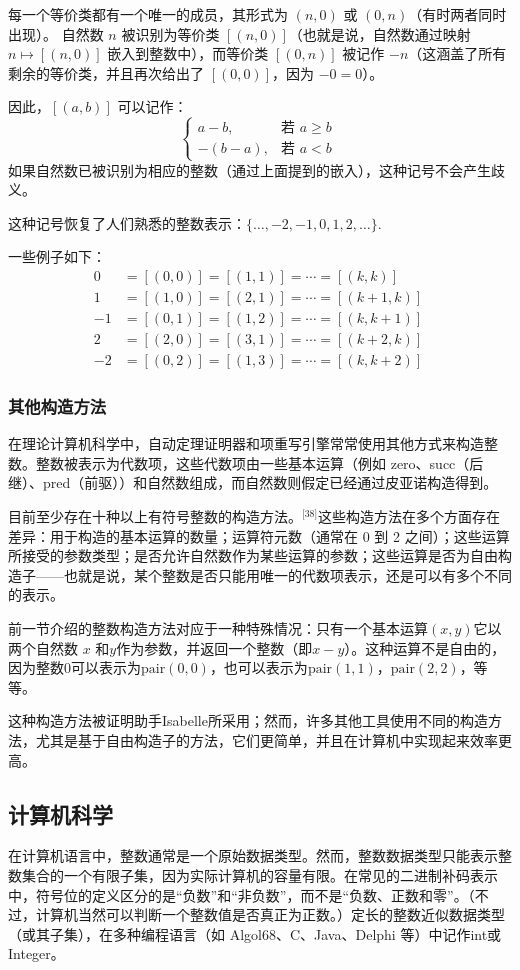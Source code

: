 每一个等价类都有一个唯一的成员，其形式为 $(n,0)$ 或 $(0,n)$（有时两者同时出现）。
自然数 $n$ 被识别为等价类 $[(n,0)]$（也就是说，自然数通过映射 $n \mapsto [(n,0)]$ 嵌入到整数中），而等价类 $[(0,n)]$ 被记作 $-n$（这涵盖了所有剩余的等价类，并且再次给出了 $[(0,0)]$，因为 $-0 = 0$）。

因此，$[(a,b)]$ 可以记作：
$$
\begin{cases}
a-b, & \text{若 } a \geq b \\[6pt]
-(b-a), & \text{若 } a < b
\end{cases}~
$$
如果自然数已被识别为相应的整数（通过上面提到的嵌入），这种记号不会产生歧义。

这种记号恢复了人们熟悉的整数表示：$\{ \ldots, -2, -1, 0, 1, 2, \ldots \}$.

一些例子如下：
$$
\begin{aligned}
0 &= [(0,0)] = [(1,1)] = \cdots = [(k,k)] \\[6pt]
1 &= [(1,0)] = [(2,1)] = \cdots = [(k+1,k)] \\[6pt]
-1 &= [(0,1)] = [(1,2)] = \cdots = [(k,k+1)] \\[6pt]
2 &= [(2,0)] = [(3,1)] = \cdots = [(k+2,k)] \\[6pt]
-2 &= [(0,2)] = [(1,3)] = \cdots = [(k,k+2)]
\end{aligned}~
$$
\subsubsection{其他构造方法}
在理论计算机科学中，自动定理证明器和项重写引擎常常使用其他方式来构造整数。整数被表示为代数项，这些代数项由一些基本运算（例如 zero、succ（后继）、pred（前驱））和自然数组成，而自然数则假定已经通过皮亚诺构造得到。

目前至少存在十种以上有符号整数的构造方法。\(^\text{[38]}\)这些构造方法在多个方面存在差异：用于构造的基本运算的数量；运算符元数（通常在 0 到 2 之间）；这些运算所接受的参数类型；是否允许自然数作为某些运算的参数；这些运算是否为自由构造子——也就是说，某个整数是否只能用唯一的代数项表示，还是可以有多个不同的表示。

前一节介绍的整数构造方法对应于一种特殊情况：只有一个基本运算$(x,y)$它以两个自然数 $x$ 和$y$作为参数，并返回一个整数（即$x-y$）。这种运算不是自由的，因为整数$0$可以表示为$\text{pair}(0,0)$，也可以表示为$\text{pair}(1,1)$，$\text{pair}(2,2)$，等等。

这种构造方法被证明助手Isabelle所采用；然而，许多其他工具使用不同的构造方法，尤其是基于自由构造子的方法，它们更简单，并且在计算机中实现起来效率更高。
\subsection{计算机科学}
在计算机语言中，整数通常是一个原始数据类型。然而，整数数据类型只能表示整数集合的一个有限子集，因为实际计算机的容量有限。在常见的二进制补码表示中，符号位的定义区分的是“负数”和“非负数”，而不是“负数、正数和零”。（不过，计算机当然可以判断一个整数值是否真正为正数。）定长的整数近似数据类型（或其子集），在多种编程语言（如 Algol68、C、Java、Delphi 等）中记作int或Integer。

